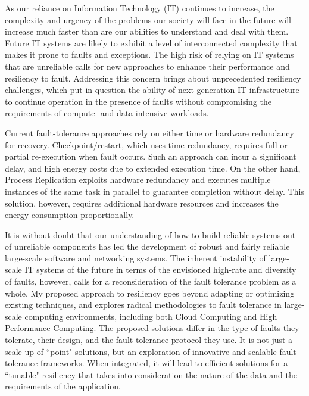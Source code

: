 As our reliance on Information Technology (IT) continues to increase, the complexity and urgency of the problems our society will face in the future will increase much faster than are our abilities to understand and deal with them. Future IT systems are likely to exhibit a level of interconnected complexity that makes it prone to faults and exceptions. The high risk of relying on IT systems that are unreliable calls for new approaches to enhance their performance and resiliency to fault. Addressing this concern brings about unprecedented resiliency challenges, which put in question the ability of next generation IT infrastructure to continue operation in the presence of faults without compromising the requirements of compute- and data-intensive workloads. 

Current fault-tolerance approaches rely on either time or hardware redundancy for recovery. Checkpoint/restart, which
uses time redundancy, requires full or partial re-execution when fault occurs. 
Such an approach
can incur a significant delay, %
and high energy costs due to extended execution time.
On the other hand, Process Replication exploits hardware redundancy and executes multiple
instances of the same task in parallel to guarantee completion without delay.  %
This solution,
however, requires additional hardware resources and increases the energy consumption proportionally. 

It is without doubt that our understanding of how to build reliable systems out of unreliable components has led the development of robust and fairly reliable large-scale software and networking systems. The inherent instability of large-scale IT systems of the future in terms of the envisioned high-rate and diversity of faults, however, calls for a reconsideration of the fault tolerance problem as a whole. %
My proposed approach to resiliency goes beyond adapting or optimizing existing techniques, and explores radical methodologies to fault tolerance in large-scale computing environments, including both Cloud Computing and High Performance Computing. The proposed solutions differ in the type of faults they tolerate, their design, and the fault tolerance protocol they use. It is not just a scale up of  ``point" solutions, but an exploration of innovative and scalable fault tolerance frameworks. When integrated, it will lead to efficient solutions for a ``tunable" resiliency that takes into consideration the nature of the data and the requirements of the application.

